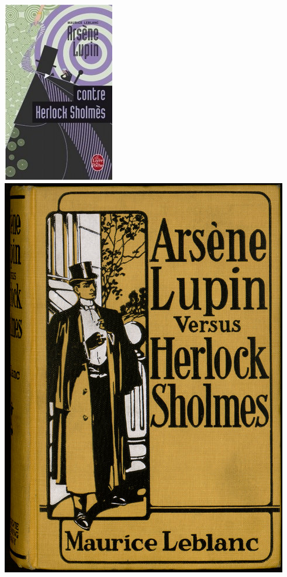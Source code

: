 \documentclass[a4paper,landscape,headrule,footrule,xetex]{foils}
\begin{document}



\includegraphics[height=0.7\textheight]{pics/arsene-lupin-vs-herlock-sholmes1-184x300.jpg}
\includegraphics[height=0.7\textheight]{pics/as-vs-hs}
\end{document}
